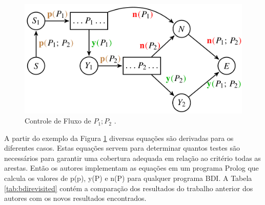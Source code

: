 \begin{figure}[ht]
\centering
\includegraphics[scale=0.3]{imagens/grafop1p2.png}
\caption{Controle de Fluxo de $P_{1};P_{2}$ \cite{winikoff2017bdi}.}
\label{fig:grafop1p2}
\end{figure}

A partir do exemplo da Figura \ref{fig:grafop1p2} diversas equações são derivadas para os diferentes casos. Estas equações servem para determinar quantos testes são necessários para garantir uma cobertura adequada em relação ao critério todas as arestas. Então os autores implementam as equações em um programa Prolog que calcula os valores de p(p), y(P) e n(P) para qualquer programa BDI. A Tabela \ref{tab:bdirevisited} contém a comparação dos resultados do trabalho anterior dos autores \cite{winikoff2014testability} com os novos resultados encontrados.

